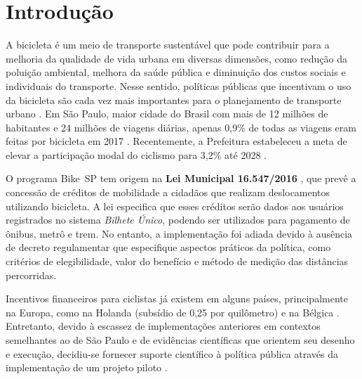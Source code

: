 

\chapter{Introdução}
\label{cap:introducao-bikesp}

A bicicleta é um meio de transporte sustentável que pode contribuir para a
melhoria da qualidade de vida urbana em diversas dimensões, como redução da
poluição ambiental, melhora da saúde pública e diminuição dos custos sociais e
individuais do transporte. Nesse sentido, políticas públicas que incentivam o
uso da bicicleta são cada vez mais importantes para o planejamento de transporte
urbano \citep{sheller2018, jeekel2017}. Em São Paulo, maior cidade do Brasil com
mais de 12 milhões de habitantes e 24 milhões de viagens diárias, apenas 0,9\%
de todas as viagens eram feitas por bicicleta em 2017 \citep{metro2017}.
Recentemente, a Prefeitura estabeleceu a meta de elevar a participação modal do
ciclismo para 3,2\% até 2028 \citep{saopauloCityHall2022}.

O programa Bike~SP tem origem na \textbf{Lei Municipal 16.547/2016}
\citep{municipalLegislation2016}, que prevê a concessão de créditos de
mobilidade a cidadãos que realizam deslocamentos utilizando bicicleta. A lei
especifica que esses créditos serão dados aos usuários registrados no sistema
\emph{Bilhete Único}, podendo ser utilizados para pagamento de ônibus, metrô e
trem. No entanto, a implementação foi adiada devido à ausência de decreto
regulamentar que especifique aspectos práticos da política, como critérios de
elegibilidade, valor do benefício e método de medição das distâncias percorridas.

Incentivos financeiros para ciclistas já existem em alguns países, principalmente
na Europa, como na Holanda (subsídio de \texteuro{}0,25 por quilômetro) e na
Bélgica \citep{tennant2022, brusselsTimes2022}. Entretanto, devido à escassez de
implementações anteriores em contextos semelhantes ao de São Paulo e de
evidências científicas que orientem seu desenho e execução, decidiu-se fornecer
suporte científico à política pública através da implementação de um projeto
piloto \citep{faria2023:bikespCaseStudy, pearson2020}.

